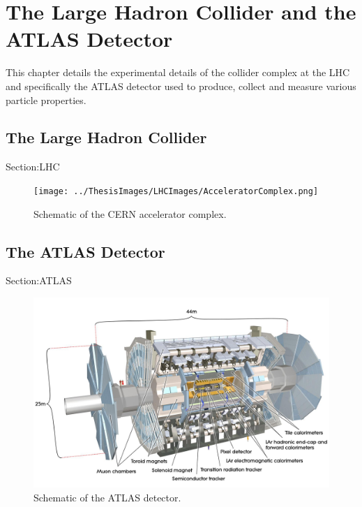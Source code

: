
\chapter{The Large Hadron Collider and the ATLAS Detector}
\label{ch:LHCDetector}

This chapter details the experimental details of the collider complex at the LHC and specifically the ATLAS detector used to produce, collect and measure various particle properties.
\section{The Large Hadron Collider}
Section:LHC

\begin{figure}[h!]
	\centering
	\texttt{[image: ../ThesisImages/LHCImages/AcceleratorComplex.png]}
	\caption[Schematic of the CERN accelerator complex.]{Schematic of the CERN accelerator complex.\cite{LHCAccComplex}
	}
	\label{fig:AcceleratorMap}
\end{figure}



\section{The ATLAS Detector}
Section:ATLAS
\begin{figure}[h!]
	\centering
	\includegraphics[width=\columnwidth]{../ThesisImages/LHCImages/AtlasDetector.png}
	\caption[Schematic of the ATLAS detector.]{Schematic of the ATLAS detector.\cite{ATLAS}
	}
	\label{fig:ATLASOverview}
\end{figure}

